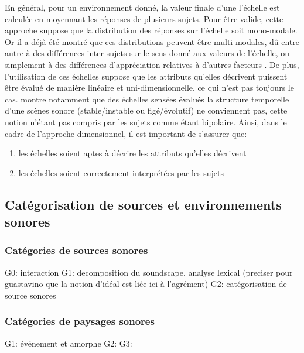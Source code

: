En général, pour un environnement donné, la valeur finale d'une l'échelle est calculée en moyennant les réponses de plusieurs sujets. Pour être valide, cette approche suppose que la distribution des réponses sur l'échelle soit mono-modale. Or il a déjà été montré que ces distributions peuvent être multi-modales, dû entre autre à des différences inter-sujets sur le sens donné aux valeurs de l'échelle, ou simplement à des différences d'appréciation relatives à d'autres facteurs \citep{raimbault2006qualitative}. De plus, l'utilisation de ces échelles suppose que les attributs qu'elles décrivent puissent être évalué de manière linéaire et uni-dimensionnelle, ce qui n'est pas toujours le cas. \citep{raimbault2006qualitative} montre notamment que des échelles sensées évalués la structure temporelle d'une scènes sonore (stable/instable ou figé/évolutif) ne conviennent pas, cette notion n'étant pas compris par les sujets comme étant bipolaire. Ainsi, dans le cadre de l'approche dimensionnel, il est important de s'assurer que:

\begin{enumerate}
\item les échelles soient aptes à décrire les attributs qu'elles décrivent
\item les échelles soient correctement interprétées par les sujets
\end{enumerate}

\subsection{Catégorisation de sources et environnements sonores}

\subsubsection{Catégories de sources sonores}

G0: \citep{gaver1993world} interaction
G1: \citep{guastavino2006ideal,szeremeta2009analysis} decomposition du soundscape, analyse lexical (preciser pour guastavino que la notion d'idéal est liée ici à l'agrément)
G2: \citep{Houix03f,guastavino2007categorization,gygi2007similarity,houix_lexical_2012} catégorisation de source sonores

\subsubsection{Catégories de paysages sonores}

G1: \citep{maffiolo_caracterisation_1999} événement et amorphe
G2: \citep{jeon2013soundwalk}
G3: \citep{brown2011towards}

